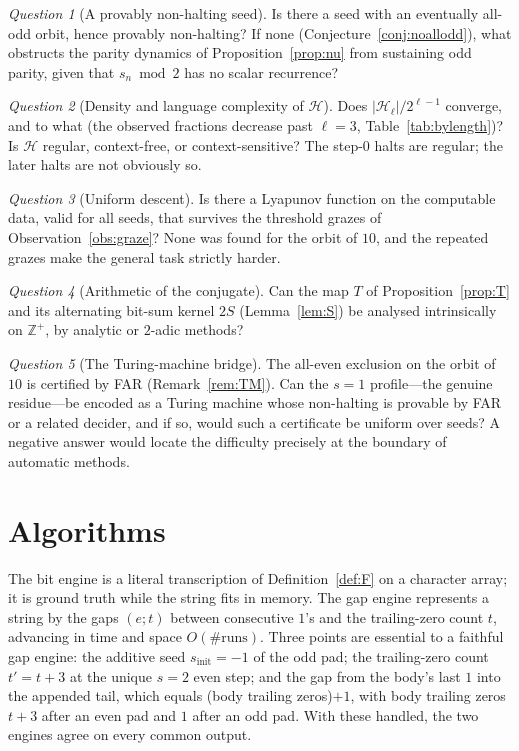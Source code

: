 \documentclass[11pt,reqno]{amsart}
\theoremstyle{plain}
\theoremstyle{definition}
\theoremstyle{remark}
\newtheorem{question}{Question}
\begin{document}
\begin{question}[A provably non-halting seed]\label{q:provable}
Is there a seed with an eventually all-odd orbit, hence provably non-halting? If none (Conjecture~\ref{conj:noallodd}), what obstructs the parity dynamics of Proposition~\ref{prop:nu} from sustaining odd parity, given that $s_n\bmod 2$ has no scalar recurrence?
\end{question}

\begin{question}[Density and language complexity of $\mathcal H$]\label{q:density}
Does $|\mathcal H_\ell|/2^{\ell-1}$ converge, and to what (the observed fractions decrease past $\ell=3$, Table~\ref{tab:bylength})? Is $\mathcal H$ regular, context-free, or context-sensitive? The step-$0$ halts are regular; the later halts are not obviously so.
\end{question}

\begin{question}[Uniform descent]\label{q:descent}
Is there a Lyapunov function on the computable data, valid for all seeds, that survives the threshold grazes of Observation~\ref{obs:graze}? None was found for the orbit of $10$, and the repeated grazes make the general task strictly harder.
\end{question}

\begin{question}[Arithmetic of the conjugate]\label{q:arith}
Can the map $T$ of Proposition~\ref{prop:T} and its alternating bit-sum kernel $2S$ (Lemma~\ref{lem:S}) be analysed intrinsically on $\mathbb Z^+$, by analytic or $2$-adic methods?
\end{question}

\begin{question}[The Turing-machine bridge]\label{q:TM}
The all-even exclusion on the orbit of $10$ is certified by FAR (Remark~\ref{rem:TM}). Can the $s=1$ profile---the genuine residue---be encoded as a Turing machine whose non-halting is provable by FAR or a related decider, and if so, would such a certificate be uniform over seeds? A negative answer would locate the difficulty precisely at the boundary of automatic methods.
\end{question}

\appendix
\section{Algorithms}\label{app:alg}
The bit engine is a literal transcription of Definition~\ref{def:F} on a character array; it is ground truth while the string fits in memory. The gap engine represents a string by the gaps $(e;t)$ between consecutive $1$'s and the trailing-zero count $t$, advancing in time and space $O(\#\text{runs})$. Three points are essential to a faithful gap engine: the additive seed $s_{\mathrm{init}}=-1$ of the odd pad; the trailing-zero count $t'=t+3$ at the unique $s=2$ even step; and the gap from the body's last $1$ into the appended tail, which equals (body trailing zeros)$+1$, with body trailing zeros $t+3$ after an even pad and $1$ after an odd pad. With these handled, the two engines agree on every common output.
\end{document}
